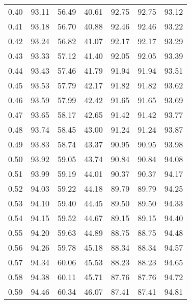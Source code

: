 \begin{tabular}{|c|c|c|c|c|c|c|}
      0.40 &     93.11 &     56.49 &      40.61 &   92.75 &      92.75 &         93.12 \\
      0.41 &     93.18 &     56.70 &      40.88 &   92.46 &      92.46 &         93.22 \\
      0.42 &     93.24 &     56.82 &      41.07 &   92.17 &      92.17 &         93.29 \\
      0.43 &     93.33 &     57.12 &      41.40 &   92.05 &      92.05 &         93.39 \\
      0.44 &     93.43 &     57.46 &      41.79 &   91.94 &      91.94 &         93.51 \\
      0.45 &     93.53 &     57.79 &      42.17 &   91.82 &      91.82 &         93.62 \\
      0.46 &     93.59 &     57.99 &      42.42 &   91.65 &      91.65 &         93.69 \\
      0.47 &     93.65 &     58.17 &      42.65 &   91.42 &      91.42 &         93.77 \\
      0.48 &     93.74 &     58.45 &      43.00 &   91.24 &      91.24 &         93.87 \\
      0.49 &     93.83 &     58.74 &      43.37 &   90.95 &      90.95 &         93.98 \\
      0.50 &     93.92 &     59.05 &      43.74 &   90.84 &      90.84 &         94.08 \\
      0.51 &     93.99 &     59.19 &      44.01 &   90.37 &      90.37 &         94.17 \\
      0.52 &     94.03 &     59.22 &      44.18 &   89.79 &      89.79 &         94.25 \\
      0.53 &     94.10 &     59.40 &      44.45 &   89.50 &      89.50 &         94.33 \\
      0.54 &     94.15 &     59.52 &      44.67 &   89.15 &      89.15 &         94.40 \\
      0.55 &     94.20 &     59.63 &      44.89 &   88.75 &      88.75 &         94.48 \\
      0.56 &     94.26 &     59.78 &      45.18 &   88.34 &      88.34 &         94.57 \\
      0.57 &     94.34 &     60.06 &      45.53 &   88.23 &      88.23 &         94.65 \\
      0.58 &     94.38 &     60.11 &      45.71 &   87.76 &      87.76 &         94.72 \\
      0.59 &     94.46 &     60.34 &      46.07 &   87.41 &      87.41 &         94.81 \\

\end{tabular}
